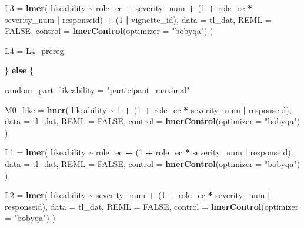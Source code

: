 \documentclass[
]{article}
\newenvironment{Shaded}{\begin{snugshade}}{\end{snugshade}}
\newcommand{\AttributeTok}[1]{\textcolor[rgb]{0.13,0.29,0.53}{#1}}
\newcommand{\ConstantTok}[1]{\textcolor[rgb]{0.56,0.35,0.01}{#1}}
\newcommand{\ControlFlowTok}[1]{\textcolor[rgb]{0.13,0.29,0.53}{\textbf{#1}}}
\newcommand{\DecValTok}[1]{\textcolor[rgb]{0.00,0.00,0.81}{#1}}
\newcommand{\FunctionTok}[1]{\textcolor[rgb]{0.13,0.29,0.53}{\textbf{#1}}}
\newcommand{\NormalTok}[1]{#1}
\newcommand{\OtherTok}[1]{\textcolor[rgb]{0.56,0.35,0.01}{#1}}
\newcommand{\SpecialCharTok}[1]{\textcolor[rgb]{0.81,0.36,0.00}{\textbf{#1}}}
\newcommand{\StringTok}[1]{\textcolor[rgb]{0.31,0.60,0.02}{#1}}
\begin{document}
\begin{Shaded}
\begin{Highlighting}[]
\NormalTok{  L3 }\OtherTok{=} \FunctionTok{lmer}\NormalTok{(}
\NormalTok{    likeability }\SpecialCharTok{\textasciitilde{}}\NormalTok{ role\_ec }\SpecialCharTok{+}\NormalTok{ severity\_num }\SpecialCharTok{+}
\NormalTok{      (}\DecValTok{1} \SpecialCharTok{+}\NormalTok{ role\_ec }\SpecialCharTok{*}\NormalTok{ severity\_num }\SpecialCharTok{|}\NormalTok{ responseid) }\SpecialCharTok{+}
\NormalTok{      (}\DecValTok{1} \SpecialCharTok{|}\NormalTok{ vignette\_id),}
    \AttributeTok{data =}\NormalTok{ tl\_dat,}
    \AttributeTok{REML =} \ConstantTok{FALSE}\NormalTok{,}
    \AttributeTok{control =} \FunctionTok{lmerControl}\NormalTok{(}\AttributeTok{optimizer =} \StringTok{"bobyqa"}\NormalTok{)}
\NormalTok{  )}

\NormalTok{  L4 }\OtherTok{=}\NormalTok{ L4\_prereg}

\NormalTok{\} }\ControlFlowTok{else}\NormalTok{ \{}

\NormalTok{  random\_part\_likeability }\OtherTok{=} \StringTok{"participant\_maximal"}

\NormalTok{  M0\_like }\OtherTok{=} \FunctionTok{lmer}\NormalTok{(}
\NormalTok{    likeability }\SpecialCharTok{\textasciitilde{}} \DecValTok{1} \SpecialCharTok{+}
\NormalTok{      (}\DecValTok{1} \SpecialCharTok{+}\NormalTok{ role\_ec }\SpecialCharTok{*}\NormalTok{ severity\_num }\SpecialCharTok{|}\NormalTok{ responseid),}
    \AttributeTok{data =}\NormalTok{ tl\_dat,}
    \AttributeTok{REML =} \ConstantTok{FALSE}\NormalTok{,}
    \AttributeTok{control =} \FunctionTok{lmerControl}\NormalTok{(}\AttributeTok{optimizer =} \StringTok{"bobyqa"}\NormalTok{)}
\NormalTok{  )}

\NormalTok{  L1 }\OtherTok{=} \FunctionTok{lmer}\NormalTok{(}
\NormalTok{    likeability }\SpecialCharTok{\textasciitilde{}}\NormalTok{ role\_ec }\SpecialCharTok{+}
\NormalTok{      (}\DecValTok{1} \SpecialCharTok{+}\NormalTok{ role\_ec }\SpecialCharTok{*}\NormalTok{ severity\_num }\SpecialCharTok{|}\NormalTok{ responseid),}
    \AttributeTok{data =}\NormalTok{ tl\_dat,}
    \AttributeTok{REML =} \ConstantTok{FALSE}\NormalTok{,}
    \AttributeTok{control =} \FunctionTok{lmerControl}\NormalTok{(}\AttributeTok{optimizer =} \StringTok{"bobyqa"}\NormalTok{)}
\NormalTok{  )}

\NormalTok{  L2 }\OtherTok{=} \FunctionTok{lmer}\NormalTok{(}
\NormalTok{    likeability }\SpecialCharTok{\textasciitilde{}}\NormalTok{ severity\_num }\SpecialCharTok{+}
\NormalTok{      (}\DecValTok{1} \SpecialCharTok{+}\NormalTok{ role\_ec }\SpecialCharTok{*}\NormalTok{ severity\_num }\SpecialCharTok{|}\NormalTok{ responseid),}
    \AttributeTok{data =}\NormalTok{ tl\_dat,}
    \AttributeTok{REML =} \ConstantTok{FALSE}\NormalTok{,}
    \AttributeTok{control =} \FunctionTok{lmerControl}\NormalTok{(}\AttributeTok{optimizer =} \StringTok{"bobyqa"}\NormalTok{)}
\NormalTok{  )}


\end{Highlighting}
\end{Shaded}
\end{document}
